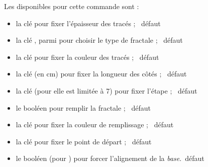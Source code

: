 \begin{cautionblock}
Les  disponibles pour cette commande sont :

\begin{itemize}
	\item la clé  pour fixer l'épaisseur des tracés ; \hfill~défaut \Cle{0.6pt}
	\item la clé , parmi  pour choisir le type de fractale ; \hfill~défaut 
	\item la clé  pour fixer la couleur des tracés ; \hfill~défaut 
	\item la clé  (en cm) pour fixer la longueur des côtés ; \hfill~défaut 
	\item la clé  (pour  elle est limitée à 7) pour fixer l'étape ; \hfill~défaut 
	\item le booléen  pour remplir la fractale ; \hfill~défaut 
	\item la clé  pour fixer la couleur de remplissage ; \hfill~défaut 
	\item la clé  pour fixer le point de départ ; \hfill~défaut 
	\item le booléen  (pour ) pour forcer l'alignement de la \textit{base}.\hfill~défaut 
\end{itemize}
\vspace*{-\baselineskip}\leavevmode
\end{cautionblock}

\begin{PresCodeTexPL}{}
\FractaleTikz
\end{PresCodeTexPL}

\begin{PresCodeTexPL}{}
\FractaleTikz[Etape=4,LongueurCote=4,Remplir,Remplissage=teal!5,Couleur=red,Epaisseur=1pt]
\end{PresCodeTexPL}

\begin{PresCodeTexPL}{}
\begin{tikzpicture}
	\FractaleTikz*[Etape=0]
	\FractaleTikz*[Depart={(4,0)},Etape=1,Remplir,Remplissage=yellow!25]
	\FractaleTikz*[Depart={(8,0)},Etape=2,Remplir,Remplissage=orange!25]
	\FractaleTikz*[Depart={(12,0)},Etape=3,Remplir,Remplissage=red!25]
\end{tikzpicture}
\end{PresCodeTexPL}

